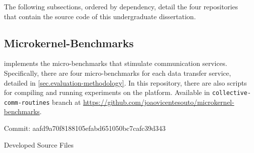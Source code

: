     The following subsections, ordered by dependency, detail the four
    repositories that contain the source code of this undergraduate dissertation.

    \subsection{Microkernel-Benchmarks}
    
        implements the micro-benchmarks that
        stimulate communication services. Specifically, there are four
        micro-benchmarks for each data transfer service, detailed in
        \autoref{sec.evaluation-methodology}. In this repository, there
        are also scripts for compiling and running experiments on the
        \mppa platform. Available in \texttt{collective-comm-routines} branch at
        \url{https://github.com/joaovicentesouto/microkernel-benchmarks}.

        Commit: aafd9a70f8188105efabd651050bc7cafc39d343
        
        Developed Source Files


